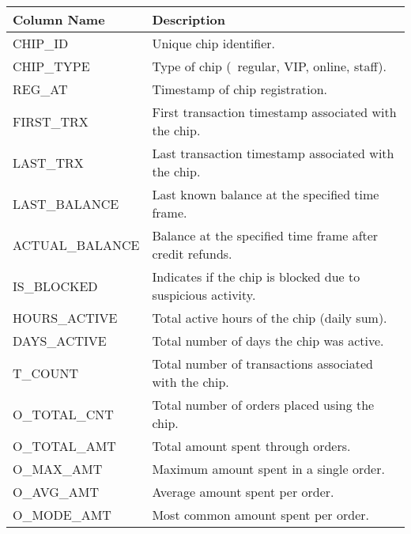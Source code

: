 \begin{table}[H]
	\centering
	\footnotesize
	\begin{tabular}{|>{\columncolor{unicorn_blue!5}}l|>{\columncolor{unicorn_blue!5}}l|}
		\hline
		\rowcolor{unicorn_blue}
		\textbf{\color{white} Column Name} & \textbf{\color{white} Description}                           \\
		\hline
		\hline
		CHIP\_ID                             & Unique chip identifier.                                      \\
		CHIP\_TYPE                           & Type of chip (\eg~regular, VIP, online, staff).              \\
		REG\_AT                              & Timestamp of chip registration.                              \\
		FIRST\_TRX                           & First transaction timestamp associated with the chip.        \\
		LAST\_TRX                            & Last transaction timestamp associated with the chip.         \\
		LAST\_BALANCE                        & Last known balance at the specified time frame.              \\
		ACTUAL\_BALANCE                      & Balance at the specified time frame after credit refunds.    \\
		\hline
		IS\_BLOCKED                          & Indicates if the chip is blocked due to suspicious activity. \\
		HOURS\_ACTIVE                        & Total active hours of the chip (daily sum).                  \\
		DAYS\_ACTIVE                         & Total number of days the chip was active.                    \\
		\hline
		T\_COUNT                             & Total number of transactions associated with the chip.       \\
		O\_TOTAL\_CNT                        & Total number of orders placed using the chip.                \\
		O\_TOTAL\_AMT                        & Total amount spent through orders.                           \\
		O\_MAX\_AMT                          & Maximum amount spent in a single order.                      \\
		O\_AVG\_AMT                          & Average amount spent per order.                              \\
		O\_MODE\_AMT                         & Most common amount spent per order.                          \\

\end{tabular}
\end{table}
